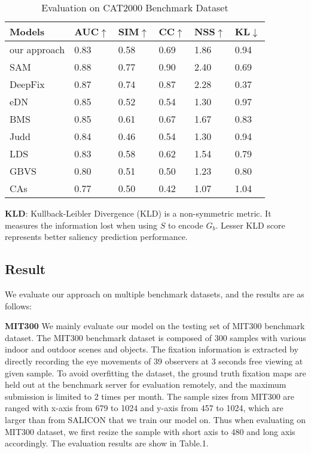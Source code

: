 \documentclass[letterpaper, 10 pt, conference]{ieeeconf}  %
\begin{document}
\begin{table}\centering
\caption{Evaluation on CAT2000 Benchmark Dataset}
\label{table}
\begin{tabular}{|p{50pt}|p{30pt}|p{30pt}|p{20pt}|p{30pt}|p{30pt}|}
\hline
Models & AUC$\uparrow$ & SIM$\uparrow$ & CC$\uparrow$ & NSS$\uparrow$ & KL$\downarrow$ \\
\hline
our approach & 0.83 & 0.58 & 0.69 & 1.86 & 0.94 \\
SAM\cite{b42} & 0.88 & 0.77 & 0.90 & 2.40 & 0.69 \\
DeepFix\cite{b6} & 0.87 & 0.74 & 0.87 & 2.28 & 0.37 \\
eDN\cite{b15} & 0.85 & 0.52 & 0.54 & 1.30 & 0.97 \\
BMS\cite{b37} & 0.85 & 0.61 & 0.67 & 1.67 & 0.83 \\
Judd\cite{b23} & 0.84 & 0.46 & 0.54 & 1.30 & 0.94 \\
LDS\cite{b40} & 0.83 & 0.58 & 0.62 & 1.54 & 0.79 \\
GBVS\cite{b39} & 0.80 & 0.51 & 0.50 & 1.23 & 0.80 \\
CAs\cite{b41} & 0.77 & 0.50 & 0.42 & 1.07 & 1.04 \\
\hline
\end{tabular}
\label{tab3}
\end{table}

\par \textbf{KLD}: Kullback-Leibler Divergence (KLD) is a non-symmetric metric. It measures the information lost when using $S$ to encode $G_{b}$. Lesser KLD score represents better saliency prediction performance.

\subsection{Result}

\par We evaluate our approach on multiple benchmark datasets, and the results are as follows:


\par \textbf{MIT300} We mainly evaluate our model on the testing set of MIT300 \cite{b36} benchmark dataset. The MIT300 benchmark dataset is composed of 300 samples with various indoor and outdoor scenes and objects. The fixation information is extracted by directly recording the eye movements of 39 observers at 3 seconds free viewing at given sample. To avoid overfitting the dataset, the ground truth fixation maps are held out at the benchmark server for evaluation remotely, and the maximum submission is limited to 2 times per month. The sample sizes from MIT300 are ranged with x-axis from 679 to 1024 and y-axis from 457 to 1024, which are larger than from SALICON that we train our model on. Thus when evaluating on MIT300 dataset, we first resize the sample with short axis to 480 and long axis accordingly. The evaluation results are show in Table.1.
\end{document}
